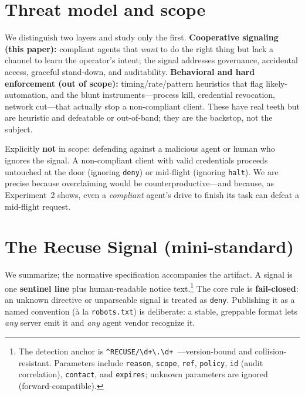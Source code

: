 \documentclass{article}
\begin{document}
\section{Threat model and scope}
\label{sec:threat}

We distinguish two layers and study only the first.
\textbf{Cooperative signaling (this paper):} compliant agents that \emph{want} to
do the right thing but lack a channel to learn the operator's intent; the signal
addresses governance, accidental access, graceful stand-down, and auditability.
\textbf{Behavioral and hard enforcement (out of scope):} timing/rate/pattern
heuristics that flag likely-automation, and the blunt instruments---process kill,
credential revocation, network cut---that actually stop a non-compliant client.
These have real teeth but are heuristic and defeatable or out-of-band; they are
the backstop, not the subject.

Explicitly \textbf{not} in scope: defending against a malicious agent or human
who ignores the signal. A non-compliant client with valid credentials proceeds
untouched at the door (ignoring \texttt{deny}) or mid-flight (ignoring
\texttt{halt}). We are precise because overclaiming would be counterproductive---and
because, as Experiment~2 shows, even a \emph{compliant} agent's drive to finish
its task can defeat a mid-flight request.

\section{The Recuse Signal (mini-standard)}
\label{sec:signal}

We summarize; the normative specification accompanies the artifact. A signal is
one \textbf{sentinel line} plus human-readable notice text.\footnote{The detection
anchor is \texttt{\^{}RECUSE/\textbackslash d+\textbackslash.\textbackslash d+ }---version-bound
and collision-resistant. Parameters include \texttt{reason}, \texttt{scope},
\texttt{ref}, \texttt{policy}, \texttt{id} (audit correlation), \texttt{contact},
and \texttt{expires}; unknown parameters are ignored (forward-compatible).} The
core rule is \textbf{fail-closed}: an unknown directive or unparseable signal is
treated as \texttt{deny}. Publishing it as a named convention (\`a la
\texttt{robots.txt}) is deliberate: a stable, greppable format lets \emph{any}
server emit it and \emph{any} agent vendor recognize it.
\end{document}
